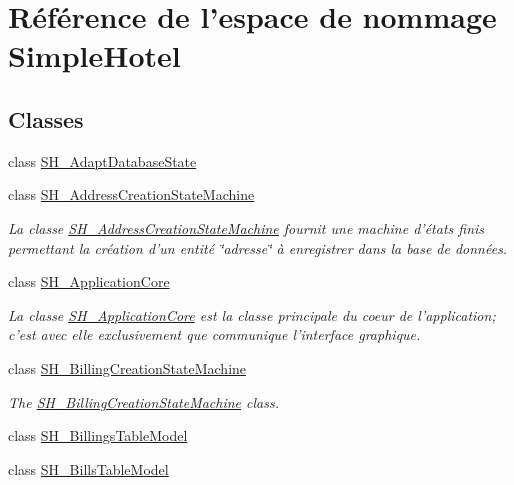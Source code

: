 \hypertarget{namespaceSimpleHotel}{\section{Référence de l'espace de nommage Simple\-Hotel}
\label{namespaceSimpleHotel}
}
\subsection*{Classes}
\begin{DoxyCompactItemize}
\item 
class \hyperlink{classSimpleHotel_1_1SH__AdaptDatabaseState}{S\-H\-\_\-\-Adapt\-Database\-State}
\item 
class \hyperlink{classSimpleHotel_1_1SH__AddressCreationStateMachine}{S\-H\-\_\-\-Address\-Creation\-State\-Machine}
\begin{DoxyCompactList}\small\item\em La classe \hyperlink{classSimpleHotel_1_1SH__AddressCreationStateMachine}{S\-H\-\_\-\-Address\-Creation\-State\-Machine} fournit une machine d'états finis permettant la création d'un entité \char`\"{}adresse\char`\"{} à enregistrer dans la base de données. \end{DoxyCompactList}\item 
class \hyperlink{classSimpleHotel_1_1SH__ApplicationCore}{S\-H\-\_\-\-Application\-Core}
\begin{DoxyCompactList}\small\item\em La classe \hyperlink{classSimpleHotel_1_1SH__ApplicationCore}{S\-H\-\_\-\-Application\-Core} est la classe principale du coeur de l'application; c'est avec elle exclusivement que communique l'interface graphique. \end{DoxyCompactList}\item 
class \hyperlink{classSimpleHotel_1_1SH__BillingCreationStateMachine}{S\-H\-\_\-\-Billing\-Creation\-State\-Machine}
\begin{DoxyCompactList}\small\item\em The \hyperlink{classSimpleHotel_1_1SH__BillingCreationStateMachine}{S\-H\-\_\-\-Billing\-Creation\-State\-Machine} class. \end{DoxyCompactList}\item 
class \hyperlink{classSimpleHotel_1_1SH__BillingsTableModel}{S\-H\-\_\-\-Billings\-Table\-Model}
\item 
class \hyperlink{classSimpleHotel_1_1SH__BillsTableModel}{S\-H\-\_\-\-Bills\-Table\-Model}
\item 

\end{DoxyCompactItemize}
